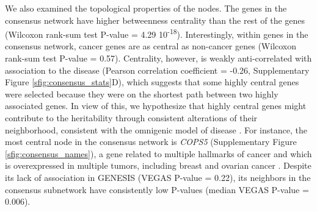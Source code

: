 \documentclass[twocolumn, 10pt]{article}
\begin{document}
We also examined the topological properties of the nodes. The genes in the consensus network have higher betweenness centrality than the rest of the genes (Wilcoxon rank-sum test P-value = 4.29 \texttimes{} 10\textsuperscript{-18}). Interestingly, within genes in the consensus network, cancer genes are as central as non-cancer genes (Wilcoxon rank-sum test P-value = 0.57). Centrality, however, is weakly anti-correlated with association to the disease (Pearson correlation coefficient = -0.26, Supplementary Figure \ref{sfig:consensus_stats}D), which suggests that some highly central genes were selected because they were on the shortest path between two highly associated genes. In view of this, we hypothesize that highly central genes might contribute to the heritability through consistent alterations of their neighborhood, consistent with the omnigenic model of disease \cite{boyle_expanded_2017}. For instance, the most central node in the consensus network is \emph{COPS5} (Supplementary Figure \ref{sfig:consensus_names}), a gene related to multiple hallmarks of cancer and which is overexpressed in multiple tumors, including breast and ovarian cancer \cite{liu_jab1_cops5_2018}. Despite its lack of association in GENESIS (VEGAS P-value = 0.22), its neighbors in the consensus subnetwork have consistently low P-values (median VEGAS P-value = 0.006).

\end{document}
